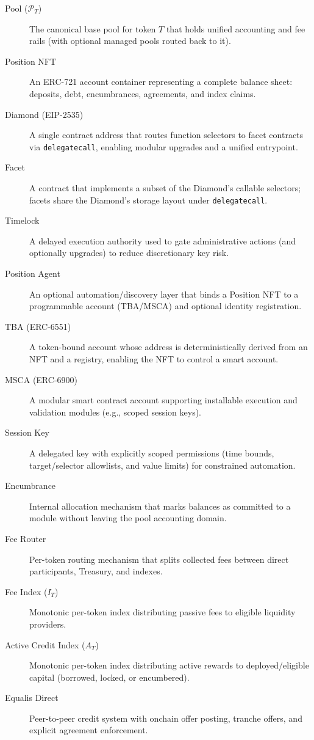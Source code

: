 \documentclass[version=preprint]{iacrcc}
\begin{document}
\begin{description}
  \item[Pool ($\mathcal{P}_T$)] The canonical base pool for token $T$ that holds unified accounting and fee rails (with optional managed pools routed back to it).
  \item[Position NFT] An ERC-721 account container representing a complete balance sheet: deposits, debt, encumbrances, agreements, and index claims.
  \item[Diamond (EIP-2535)] A single contract address that routes function selectors to facet contracts via \texttt{delegatecall}, enabling modular upgrades and a unified entrypoint.
  \item[Facet] A contract that implements a subset of the Diamond's callable selectors; facets share the Diamond's storage layout under \texttt{delegatecall}.
  \item[Timelock] A delayed execution authority used to gate administrative actions (and optionally upgrades) to reduce discretionary key risk.
  \item[Position Agent] An optional automation/discovery layer that binds a Position NFT to a programmable account (TBA/MSCA) and optional identity registration.
  \item[TBA (ERC-6551)] A token-bound account whose address is deterministically derived from an NFT and a registry, enabling the NFT to control a smart account.
  \item[MSCA (ERC-6900)] A modular smart contract account supporting installable execution and validation modules (e.g., scoped session keys).
  \item[Session Key] A delegated key with explicitly scoped permissions (time bounds, target/selector allowlists, and value limits) for constrained automation.
  \item[Encumbrance] Internal allocation mechanism that marks balances as committed to a module without leaving the pool accounting domain.
  \item[Fee Router] Per-token routing mechanism that splits collected fees between direct participants, Treasury, and indexes.
  \item[Fee Index ($I_T$)] Monotonic per-token index distributing passive fees to eligible liquidity providers.
  \item[Active Credit Index ($A_T$)] Monotonic per-token index distributing active rewards to deployed/eligible capital (borrowed, locked, or encumbered).
  \item[Equalis Direct] Peer-to-peer credit system with onchain offer posting, tranche offers, and explicit agreement enforcement.

\end{description}
\end{document}
